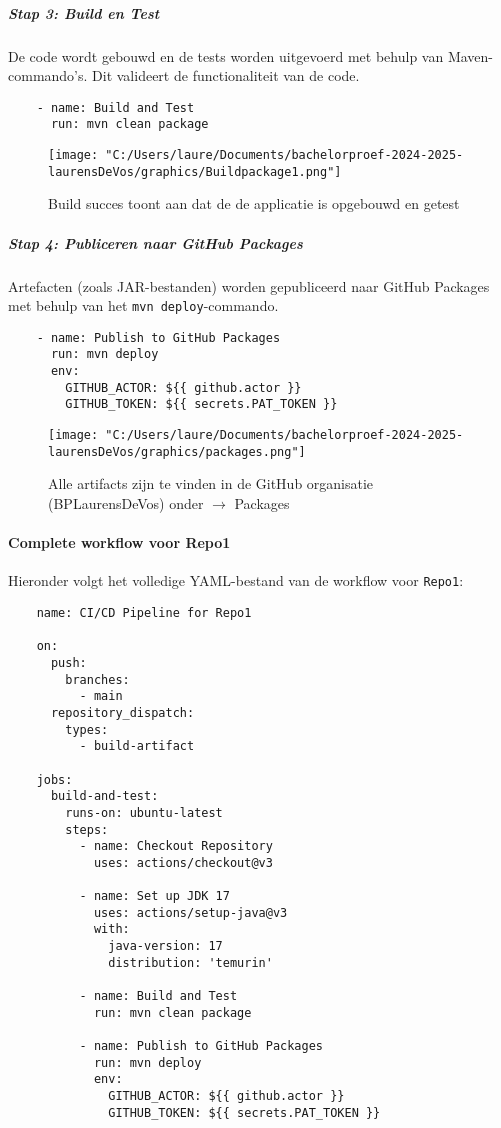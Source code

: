 \subparagraph{Stap 3: Build en Test}
De code wordt gebouwd en de tests worden uitgevoerd met behulp van Maven-commando's. Dit valideert de functionaliteit van de code.

\begin{verbatim}
    - name: Build and Test
      run: mvn clean package
\end{verbatim}

\begin{figure}[h!]
    \centering
    \texttt{[image: "C:/Users/laure/Documents/bachelorproef-2024-2025-laurensDeVos/graphics/Buildpackage1.png"]}
    \caption{Build succes toont aan dat de de applicatie is opgebouwd en getest}
\end{figure}


\subparagraph{Stap 4: Publiceren naar GitHub Packages}
Artefacten (zoals JAR-bestanden) worden gepubliceerd naar GitHub Packages met behulp van het \texttt{mvn deploy}-commando. 

\begin{verbatim}
    - name: Publish to GitHub Packages
      run: mvn deploy
      env:
        GITHUB_ACTOR: ${{ github.actor }}
        GITHUB_TOKEN: ${{ secrets.PAT_TOKEN }}
\end{verbatim}

\begin{figure}[h!]
    \centering
    \texttt{[image: "C:/Users/laure/Documents/bachelorproef-2024-2025-laurensDeVos/graphics/packages.png"]}
    \caption{Alle artifacts zijn te vinden in de GitHub organisatie (BPLaurensDeVos) onder $\rightarrow$ Packages}
\end{figure}

\paragraph{Complete workflow voor Repo1}
Hieronder volgt het volledige YAML-bestand van de workflow voor \texttt{Repo1}:

\begin{verbatim}
    name: CI/CD Pipeline for Repo1
    
    on:
      push:
        branches:
          - main
      repository_dispatch:
        types:
          - build-artifact
    
    jobs:
      build-and-test:
        runs-on: ubuntu-latest
        steps:
          - name: Checkout Repository
            uses: actions/checkout@v3
    
          - name: Set up JDK 17
            uses: actions/setup-java@v3
            with:
              java-version: 17
              distribution: 'temurin'
    
          - name: Build and Test
            run: mvn clean package
    
          - name: Publish to GitHub Packages
            run: mvn deploy
            env:
              GITHUB_ACTOR: ${{ github.actor }}
              GITHUB_TOKEN: ${{ secrets.PAT_TOKEN }}
\end{verbatim}

